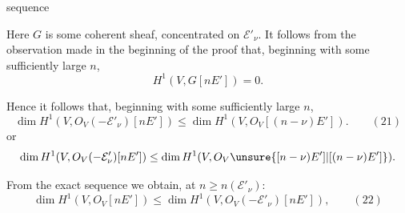 sequence

Here $G$ is some coherent sheaf, concentrated on $\mathcal E'_\nu$. It follows from the observation made in the beginning of the proof that, beginning with some sufficiently large $n$,
\[
H^1(V,G[nE'])=0.
\]

Hence it follows that, beginning with some sufficiently large $n$,
\[
\dim H^1(V,O_V(-\mathcal E'_\nu)[nE'])\le\dim H^1(V,O_V[(n-\nu)E']).\qquad (21)
\]
or
\[
\dim H^1(V,O_V(-\mathcal E'_\nu)[nE'])\le\dim H^1(V,O_V\unsure{[n-\nu)E']|[(n-\nu)E']}).
\]

From the exact sequence
we obtain, at $n\ge n(\mathcal E'_\nu)$:
\[
\dim H^1(V,O_V[nE'])\le\dim H^1(V,O_V(-\mathcal E'_\nu)[nE']),\qquad (22)
\]
